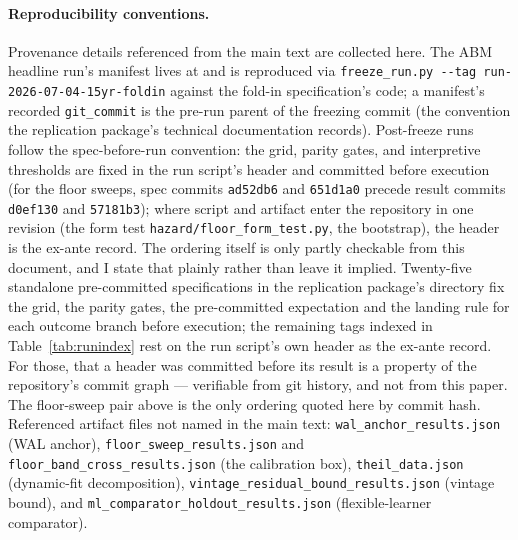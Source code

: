 \documentclass[12pt]{article}
\begin{document}
\paragraph{Reproducibility conventions.} Provenance details referenced from the main text are collected here. The ABM headline run's manifest lives at  and is reproduced via \texttt{freeze\_run.py -{}-tag run-2026-07-04-15yr-foldin} against the fold-in specification's code; a manifest's recorded \texttt{git\_commit} is the pre-run parent of the freezing commit (the convention the replication package's technical documentation records). Post-freeze runs follow the spec-before-run convention: the grid, parity gates, and interpretive thresholds are fixed in the run script's header and committed before execution (for the floor sweeps, spec commits \texttt{ad52db6} and \texttt{651d1a0} precede result commits \texttt{d0ef130} and \texttt{57181b3}); where script and artifact enter the repository in one revision (the form test \texttt{hazard/floor\_form\_test.py}, the bootstrap), the header is the ex-ante record. The ordering itself is only partly checkable from this document, and I state that plainly rather than leave it implied. Twenty-five standalone pre-committed specifications in the replication package's  directory fix the grid, the parity gates, the pre-committed expectation and the landing rule for each outcome branch before execution; the remaining tags indexed in Table~\ref{tab:runindex} rest on the run script's own header as the ex-ante record. For those, that a header was committed before its result is a property of the repository's commit graph --- verifiable from git history, and not from this paper. The floor-sweep pair above is the only ordering quoted here by commit hash. Referenced artifact files not named in the main text: \texttt{wal\_anchor\_results.json} (WAL anchor), \texttt{floor\_sweep\_results.json} and \texttt{floor\_band\_cross\_results.json} (the calibration box), \texttt{theil\_data.json} (dynamic-fit decomposition), \texttt{vintage\_residual\_bound\_results.json} (vintage bound), and \texttt{ml\_comparator\_holdout\_results.json} (flexible-learner comparator).
\end{document}
